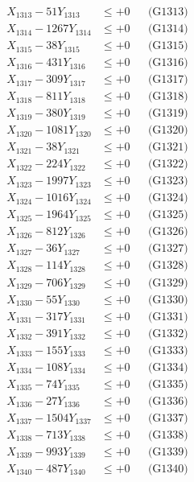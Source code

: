 \documentclass[a4paper,10pt]{article}
\begin{document}
{\begin{align}
X_{1313} - 51Y_{1313} &\leq +0 && \text{(G1313)} \\
X_{1314} - 1267Y_{1314} &\leq +0 && \text{(G1314)} \\
X_{1315} - 38Y_{1315} &\leq +0 && \text{(G1315)} \\
X_{1316} - 431Y_{1316} &\leq +0 && \text{(G1316)} \\
X_{1317} - 309Y_{1317} &\leq +0 && \text{(G1317)} \\
X_{1318} - 811Y_{1318} &\leq +0 && \text{(G1318)} \\
X_{1319} - 380Y_{1319} &\leq +0 && \text{(G1319)} \\
X_{1320} - 1081Y_{1320} &\leq +0 && \text{(G1320)} \\
\allowbreak
X_{1321} - 38Y_{1321} &\leq +0 && \text{(G1321)} \\
X_{1322} - 224Y_{1322} &\leq +0 && \text{(G1322)} \\
X_{1323} - 1997Y_{1323} &\leq +0 && \text{(G1323)} \\
X_{1324} - 1016Y_{1324} &\leq +0 && \text{(G1324)} \\
X_{1325} - 1964Y_{1325} &\leq +0 && \text{(G1325)} \\
X_{1326} - 812Y_{1326} &\leq +0 && \text{(G1326)} \\
X_{1327} - 36Y_{1327} &\leq +0 && \text{(G1327)} \\
X_{1328} - 114Y_{1328} &\leq +0 && \text{(G1328)} \\
X_{1329} - 706Y_{1329} &\leq +0 && \text{(G1329)} \\
X_{1330} - 55Y_{1330} &\leq +0 && \text{(G1330)} \\
\allowbreak
X_{1331} - 317Y_{1331} &\leq +0 && \text{(G1331)} \\
X_{1332} - 391Y_{1332} &\leq +0 && \text{(G1332)} \\
X_{1333} - 155Y_{1333} &\leq +0 && \text{(G1333)} \\
X_{1334} - 108Y_{1334} &\leq +0 && \text{(G1334)} \\
X_{1335} - 74Y_{1335} &\leq +0 && \text{(G1335)} \\
X_{1336} - 27Y_{1336} &\leq +0 && \text{(G1336)} \\
X_{1337} - 1504Y_{1337} &\leq +0 && \text{(G1337)} \\
X_{1338} - 713Y_{1338} &\leq +0 && \text{(G1338)} \\
X_{1339} - 993Y_{1339} &\leq +0 && \text{(G1339)} \\
X_{1340} - 487Y_{1340} &\leq +0 && \text{(G1340)} \\

\end{align}}
\end{document}
